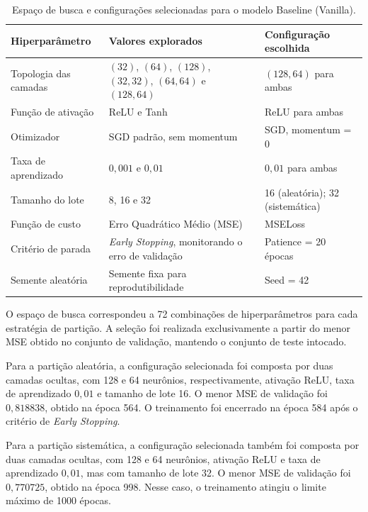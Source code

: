 \documentclass[11pt,a4paper]{article}
\begin{document}
\begin{table}[H]
\centering
\small
\caption{Espaço de busca e configurações selecionadas para o modelo
Baseline (Vanilla).}
\label{tab:baseline_hiper}
\begin{tabularx}{\textwidth}{lXl}
\toprule
\textbf{Hiperparâmetro} &
\textbf{Valores explorados} &
\textbf{Configuração escolhida} \\
\midrule
Topologia das camadas &
$(32)$, $(64)$, $(128)$, $(32,32)$, $(64,64)$ e $(128,64)$ &
$(128,64)$ para ambas \\

Função de ativação &
ReLU e Tanh &
ReLU para ambas \\

Otimizador &
SGD padrão, sem momentum &
SGD, momentum = 0 \\

Taxa de aprendizado &
$0,001$ e $0,01$ &
$0,01$ para ambas \\

Tamanho do lote &
8, 16 e 32 &
16 (aleatória); 32 (sistemática) \\

Função de custo &
Erro Quadrático Médio (MSE) &
MSELoss \\

Critério de parada &
\textit{Early Stopping}, monitorando o erro de validação &
Patience = 20 épocas \\

Semente aleatória &
Semente fixa para reprodutibilidade &
Seed = 42 \\
\bottomrule
\end{tabularx}
\end{table}

O espaço de busca correspondeu a 72 combinações de hiperparâmetros para
cada estratégia de partição. A seleção foi realizada exclusivamente a
partir do menor MSE obtido no conjunto de validação, mantendo o conjunto
de teste intocado.

Para a partição aleatória, a configuração selecionada foi composta por
duas camadas ocultas, com 128 e 64 neurônios, respectivamente, ativação
ReLU, taxa de aprendizado $0,01$ e tamanho de lote 16. O menor MSE de
validação foi $0,818838$, obtido na época 564. O treinamento foi
encerrado na época 584 após o critério de \textit{Early Stopping}.

Para a partição sistemática, a configuração selecionada também foi
composta por duas camadas ocultas, com 128 e 64 neurônios, ativação ReLU
e taxa de aprendizado $0,01$, mas com tamanho de lote 32. O menor MSE de
validação foi $0,770725$, obtido na época 998. Nesse caso, o treinamento
atingiu o limite máximo de 1000 épocas.
\end{document}
